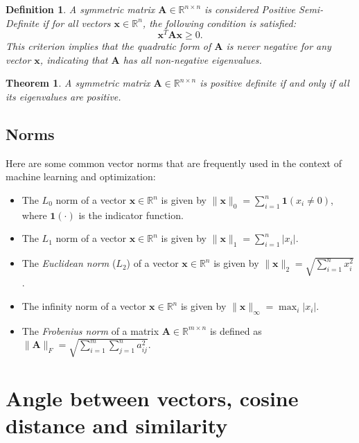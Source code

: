 \documentclass[11pt]{book} %
\newtheorem{theorem}{Theorem}[section]
\newtheorem{definition}{Definition}[section]
\begin{document}
\begin{definition}
A symmetric matrix \(\mathbf{A} \in \mathbb{R}^{n \times n}\) is considered \textit{Positive Semi-Definite} if for all vectors \(\mathbf{x} \in \mathbb{R}^n\), the following condition is satisfied:
\begin{equation}
\mathbf{x}^T \mathbf{A} \mathbf{x} \geq 0.
\end{equation}
This criterion implies that the quadratic form of \(\mathbf{A}\) is never negative for any vector \(\mathbf{x}\), indicating that \(\mathbf{A}\) has all non-negative eigenvalues.
\end{definition}

\begin{theorem}
A symmetric matrix \(\mathbf{A} \in \mathbb{R}^{n \times n}\) is positive definite if and only if all its eigenvalues are positive.
\end{theorem}

\subsection{Norms}
Here are some common vector norms that are frequently used in the context of machine learning and optimization:
\begin{itemize}
    \item The $L_0$ norm of a vector \(\mathbf{x} \in \mathbb{R}^n\) is given by \(\lVert \mathbf{x} \rVert_0 = \sum_{i=1}^{n} \mathbf{1}(x_i \neq 0)\), where \(\mathbf{1}(\cdot)\) is the indicator function.
    \item The $L_1$ norm of a vector \(\mathbf{x} \in \mathbb{R}^n\) is given by \(\lVert \mathbf{x} \rVert_1 = \sum_{i=1}^{n} \lvert x_i \rvert\).
    \item The \textit{Euclidean norm} ($L_2$) of a vector \(\mathbf{x} \in \mathbb{R}^n\) is given by \(\lVert \mathbf{x} \rVert_2 = \sqrt{\sum_{i=1}^{n} x_i^2}\).
    \item The infinity norm of a vector \(\mathbf{x} \in \mathbb{R}^n\) is given by \(\lVert \mathbf{x} \rVert_{\infty} = \max_{i} \lvert x_i \rvert\).
    \item The \textit{Frobenius norm} of a matrix \(\mathbf{A} \in \mathbb{R}^{m \times n}\) is defined as \(\lVert \mathbf{A} \rVert_F = \sqrt{\sum_{i=1}^{m} \sum_{j=1}^{n} a_{ij}^2}\).
\end{itemize}

\section{Angle between vectors, cosine distance and similarity}
\end{document}
